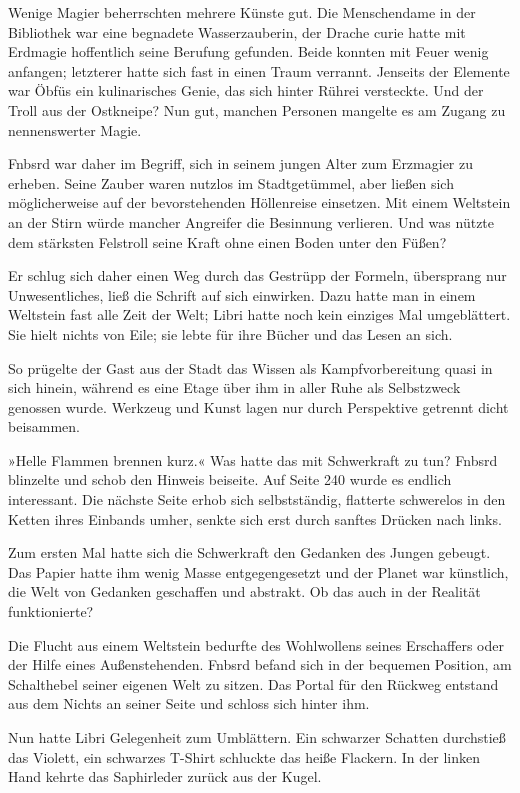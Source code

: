 Wenige Magier beherrschten mehrere Künste gut. Die Menschendame in der Bibliothek war eine begnadete Wasserzauberin, der Drache curie hatte mit Erdmagie hoffentlich seine Berufung gefunden. Beide konnten mit Feuer wenig anfangen; letzterer hatte sich fast in einen Traum verrannt. Jenseits der Elemente war Öbfüs ein kulinarisches Genie, das sich hinter Rührei versteckte. Und der Troll aus der Ostkneipe? Nun gut, manchen Personen mangelte es am Zugang zu nennenswerter Magie.

Fnbsrd war daher im Begriff, sich in seinem jungen Alter zum Erzmagier zu erheben. Seine Zauber waren nutzlos im Stadtgetümmel, aber ließen sich möglicherweise auf der bevorstehenden Höllenreise einsetzen. Mit einem Weltstein an der Stirn würde mancher Angreifer die Besinnung verlieren. Und was nützte dem stärksten Felstroll seine Kraft ohne einen Boden unter den Füßen?

Er schlug sich daher einen Weg durch das Gestrüpp der Formeln, übersprang nur Unwesentliches, ließ die Schrift auf sich einwirken. Dazu hatte man in einem Weltstein fast alle Zeit der Welt; Libri hatte noch kein einziges Mal umgeblättert. Sie hielt nichts von Eile; sie lebte für ihre Bücher und das Lesen an sich.

So prügelte der Gast aus der Stadt das Wissen als Kampfvorbereitung quasi in sich hinein, während es eine Etage über ihm in aller Ruhe als Selbstzweck genossen wurde. Werkzeug und Kunst lagen nur durch Perspektive getrennt dicht beisammen.

»Helle Flammen brennen kurz.« Was hatte das mit Schwerkraft zu tun? Fnbsrd blinzelte und schob den Hinweis beiseite. Auf Seite 240 wurde es endlich interessant. Die nächste Seite erhob sich selbstständig, flatterte schwerelos in den Ketten ihres Einbands umher, senkte sich erst durch sanftes Drücken nach links.

Zum ersten Mal hatte sich die Schwerkraft den Gedanken des Jungen gebeugt. Das Papier hatte ihm wenig Masse entgegengesetzt und der Planet war künstlich, die Welt von Gedanken geschaffen und abstrakt. Ob das auch in der Realität funktionierte?

Die Flucht aus einem Weltstein bedurfte des Wohlwollens seines Erschaffers oder der Hilfe eines Außenstehenden. Fnbsrd befand sich in der bequemen Position, am Schalthebel seiner eigenen Welt zu sitzen. Das Portal für den Rückweg entstand aus dem Nichts an seiner Seite und schloss sich hinter ihm.

Nun hatte Libri Gelegenheit zum Umblättern. Ein schwarzer Schatten durchstieß das Violett, ein schwarzes T-Shirt schluckte das heiße Flackern. In der linken Hand kehrte das Saphirleder zurück aus der Kugel.

